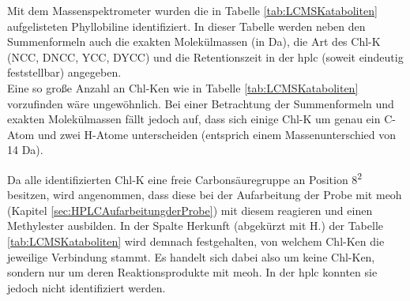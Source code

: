 Mit dem Massenspektrometer wurden die in Tabelle \ref{tab:LCMSKataboliten} aufgelisteten Phyllobiline identifiziert. In dieser Tabelle werden neben den Summenformeln auch die exakten Molekülmassen (in Da), die Art des \gls{Chl-K} (NCC, DNCC, YCC, DYCC) und die Retentionszeit in der \gls{hplc} (soweit eindeutig feststellbar) angegeben. \\

Eine so große Anzahl an \gls{Chl-K}en wie in Tabelle \ref{tab:LCMSKataboliten} vorzufinden wäre ungewöhnlich. Bei einer Betrachtung der Summenformeln und exakten Molekülmassen fällt jedoch auf, dass sich einige \gls{Chl-K} um genau ein C-Atom und zwei H-Atome unterscheiden (entsprich einem Massenunterschied von 14 Da). 

Da alle identifizierten \gls{Chl-K} eine freie Carbonsäuregruppe an Position 8\textsuperscript{2} besitzen, wird angenommen, dass diese bei der Aufarbeitung der Probe mit \gls{meoh} (Kapitel \ref{sec:HPLCAufarbeitungderProbe}) mit diesem reagieren und einen Methylester ausbilden. In der Spalte Herkunft (abgekürzt mit H.) der Tabelle \ref{tab:LCMSKataboliten} wird demnach festgehalten, von welchem \gls{Chl-K}en die jeweilige Verbindung stammt. Es handelt sich dabei also um keine \gls{Chl-K}en, sondern nur um deren Reaktionsprodukte mit \gls{meoh}. In der \gls{hplc} konnten sie jedoch nicht identifiziert werden. \\

